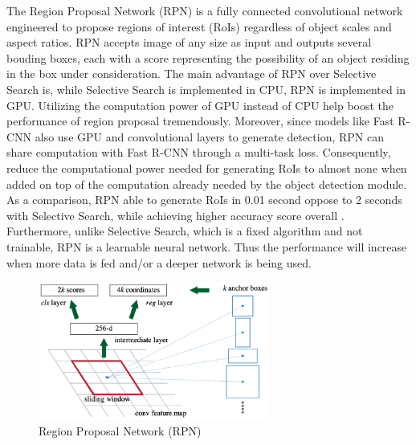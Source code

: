 The Region Proposal Network (RPN) is a fully connected convolutional network engineered to propose regions of interest (RoIs) regardless of object scales and aspect ratios. RPN accepts image of any size as input and outputs several bouding boxes, each with a score representing the possibility of an object residing in the box under consideration. The main advantage of RPN over Selective Search is, while Selective Search is implemented in CPU, RPN is implemented in GPU. Utilizing the computation power of GPU instead of CPU help boost the performance of region proposal tremendously. Moreover, since models like Fast R-CNN also use GPU and convolutional layers to generate detection, RPN can share computation with Fast R-CNN through a multi-task loss. Consequently, reduce the computational power needed for generating RoIs to almost none when added on top of the computation already needed by the object detection module. As a comparison, RPN able to generate RoIs in 0.01 second oppose to 2 seconds with Selective Search, while achieving higher accuracy score overall \cite{faster_rcnn_2015}. Furthermore, unlike Selective Search, which is a fixed algorithm and not trainable, RPN is a learnable neural network. Thus the performance will increase when more data is fed and/or a deeper network is being used. 

\begin{figure}[!ht]
    \centering
    \includegraphics[width=3in]{figures/rpn_anchor.png}
    \caption{Region Proposal Network (RPN) \cite{faster_rcnn_2015}} \label{fig:faster_rcnn_anchor}
\end{figure}

